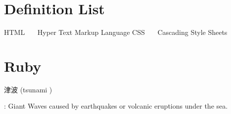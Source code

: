 \documentclass[pdflatex, a4paper, 10pt, jadriver=standard]{bxjsarticle}
\begin{document}
\section*{\Large Definition List}
  HTML\newline
  ~~~Hyper Text Markup Language
  \newline
CSS
  \newline
~~~Cascading Style Sheets\newline
  
\section*{\Large Ruby}
    
        津波
        (tsunami
)
    
    : Giant Waves caused by earthquakes or volcanic eruptions under the sea. 
    
\end{document}
